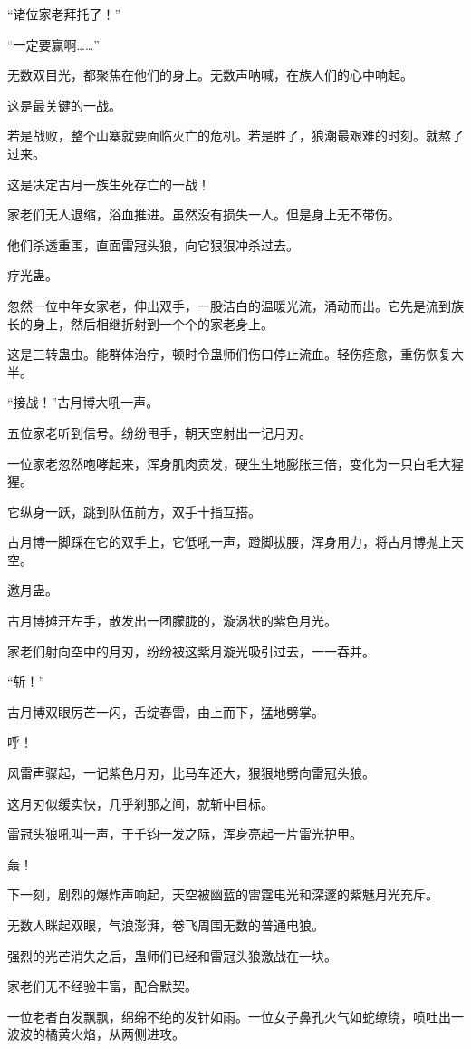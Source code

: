 \begin{this_body}
“诸位家老拜托了！”

“一定要赢啊……”

无数双目光，都聚焦在他们的身上。无数声呐喊，在族人们的心中响起。

这是最关键的一战。

若是战败，整个山寨就要面临灭亡的危机。若是胜了，狼潮最艰难的时刻。就熬了过来。

这是决定古月一族生死存亡的一战！

家老们无人退缩，浴血推进。虽然没有损失一人。但是身上无不带伤。

他们杀透重围，直面雷冠头狼，向它狠狠冲杀过去。

疗光蛊。

忽然一位中年女家老，伸出双手，一股洁白的温暖光流，涌动而出。它先是流到族长的身上，然后相继折射到一个个的家老身上。

这是三转蛊虫。能群体治疗，顿时令蛊师们伤口停止流血。轻伤痊愈，重伤恢复大半。

“接战！”古月博大吼一声。

五位家老听到信号。纷纷甩手，朝天空射出一记月刃。

一位家老忽然咆哮起来，浑身肌肉贲发，硬生生地膨胀三倍，变化为一只白毛大猩猩。

它纵身一跃，跳到队伍前方，双手十指互搭。

古月博一脚踩在它的双手上，它低吼一声，蹬脚拔腰，浑身用力，将古月博抛上天空。

邀月蛊。

古月博摊开左手，散发出一团朦胧的，漩涡状的紫色月光。

家老们射向空中的月刃，纷纷被这紫月漩光吸引过去，一一吞并。

“斩！”

古月博双眼厉芒一闪，舌绽春雷，由上而下，猛地劈掌。

呼！

风雷声骤起，一记紫色月刃，比马车还大，狠狠地劈向雷冠头狼。

这月刃似缓实快，几乎刹那之间，就斩中目标。

雷冠头狼吼叫一声，于千钧一发之际，浑身亮起一片雷光护甲。

轰！

下一刻，剧烈的爆炸声响起，天空被幽蓝的雷霆电光和深邃的紫魅月光充斥。

无数人眯起双眼，气浪澎湃，卷飞周围无数的普通电狼。

强烈的光芒消失之后，蛊师们已经和雷冠头狼激战在一块。

家老们无不经验丰富，配合默契。

一位老者白发飘飘，绵绵不绝的发针如雨。一位女子鼻孔火气如蛇缭绕，喷吐出一波波的橘黄火焰，从两侧进攻。


\end{this_body}
